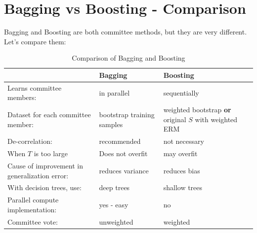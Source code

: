 \section{Bagging vs Boosting - Comparison}

Bagging and Boosting are both committee methods, but they are very different.
Let's compare them:

\begin{table}[H]
  \centering
  \begin{tabular}{|p{4.5cm}|p{5cm}|p{6.5cm}|}
    \hline
    & {\bf Bagging} & {\bf Boosting} \\
     \hline
      Learns committee members: & in parallel & sequentially \\
      \hline
      Dataset for each committee member: & bootstrap training samples
      & weighted bootstrap  {\bf or} original $S$ with weighted ERM\\
      \hline
      De-correlation: & recommended & not necessary \\
      \hline
      When $T$ is too large & Does not overfit & may overfit \\
      \hline
      Cause of improvement in generalization error: &
      reduces variance & reduces bias\\
      \hline
      With decision trees, use: & deep trees & shallow trees \\
      \hline
      Parallel compute implementation: & yes - easy & no \\
       \hline
      Committee vote: & unweighted & weighted \\
    \hline
  \end{tabular}
  \caption{Comparison of Bagging and Boosting}
\end{table}




